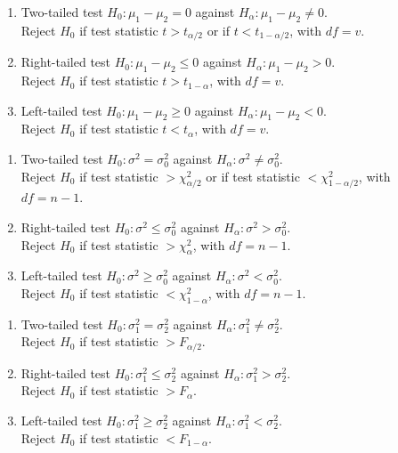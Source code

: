 \begin{definition} 
\begin{enumerate}[label=\roman*.]
\setlength{\itemsep}{0pt}
\item Two-tailed test $H_0: \mu_1 - \mu_2 = 0$ against $H_{\alpha} : \mu_1 - \mu_2 \neq 0$.\\
Reject $H_0$ if test statistic $t > t_{\alpha/2}$ or if $t < t_{1 - \alpha/2}$, with $df = v$.
\item Right-tailed test $H_0: \mu_1 - \mu_2 \leq 0$ against $H_{\alpha} : \mu_1 - \mu_2 > 0$.\\
Reject $H_0$ if test statistic $t > t_{1 - \alpha}$, with $df = v$.
\item Left-tailed test $H_0: \mu_1 - \mu_2 \geq 0$ against $H_{\alpha} : \mu_1 - \mu_2 < 0$.\\
Reject $H_0$ if test statistic $t < t_{\alpha}$, with $df = v$.
\end{enumerate}
\end{definition}

\begin{definition} 
\begin{enumerate}[label=\roman*.]
\setlength{\itemsep}{0pt}
\item Two-tailed test $H_0: \sigma^2 = \sigma_0^2$ against $H_{\alpha} : \sigma^2 \neq \sigma_0^2$.\\
Reject $H_0$ if test statistic $> \chi_{\alpha/2}^2$ or if test statistic $< \chi_{1 - \alpha/2}^2$, with $df = n-1$.
\item Right-tailed test $H_0: \sigma^2 \leq \sigma_0^2$ against $H_{\alpha} : \sigma^2 > \sigma_0^2$.\\
Reject $H_0$ if test statistic $> \chi_{\alpha}^2$, with $df = n-1$.
\item Left-tailed test $H_0: \sigma^2 \geq \sigma_0^2$ against $H_{\alpha} : \sigma^2 < \sigma_0^2$.\\
Reject $H_0$ if test statistic $< \chi_{1-\alpha}^2$, with $df = n-1$.
\end{enumerate}
\end{definition}

\begin{definition} 
\begin{enumerate}[label=\roman*.]
\setlength{\itemsep}{0pt}
\item Two-tailed test $H_0: \sigma_1^2 = \sigma_2^2$ against $H_{\alpha} : \sigma_1^2 \neq \sigma_2^2$.\\
Reject $H_0$ if test statistic $> F_{\alpha/2}$.
\item Right-tailed test $H_0: \sigma_1^2 \leq \sigma_2^2$ against $H_{\alpha} : \sigma_1^2 > \sigma_2^2$.\\
Reject $H_0$ if test statistic $> F_{\alpha}$.
\item Left-tailed test $H_0: \sigma_1^2 \geq \sigma_2^2$ against $H_{\alpha} : \sigma_1^2 < \sigma_2^2$.\\
Reject $H_0$ if test statistic $< F_{1 - \alpha}$.
\end{enumerate}
\end{definition}

